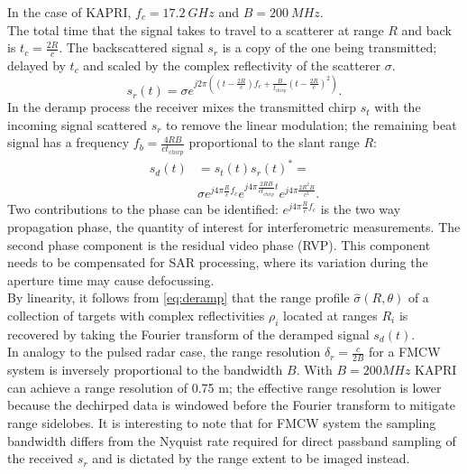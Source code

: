 In the case of KAPRI, $f_c= 17.2~GHz$ and $B=200~MHz$.\\
The total time that the signal takes to travel to a scatterer at range $R$ and back is $t_{c} = \frac{2 R}{c}$. The backscattered signal $s_r$ is a copy of the one being transmitted; delayed by $t_{c}$ and scaled by the complex reflectivity of the scatterer $\sigma$.
\begin{equation}
		s_r\left(t\right) = \sigma e^{j 2 \pi \left( \left(t - \frac{2 R}{c}\right) f_{c} +  \frac{B}{t_{chirp}} \left(t - \frac{2 R}{c}\right)^2 \right)}.
\end{equation}
In the deramp process the receiver mixes the transmitted chirp $s_t$ with the incoming signal scattered $s_r$ to remove the linear modulation; the remaining beat signal has a frequency $f_{b} = \frac{4 R B}{c t_{chirp}}$ proportional to the slant range $R$:
\begin{equation}\label{eq:deramp}
	\begin{aligned}
	s_{d}\left(t\right) &=s_t\left(t\right)s_r\left(t\right)^* =\\ 
	&\sigma e^{j 4 \pi \frac{ R}{c}f_c}  e^{j 4 \pi \frac{2 R B }{c t_{chirp}} t}  e^{j 4 \pi \frac{2 R^2 B}{c^2}}.
	\end{aligned}
\end{equation} 
Two contributions to the phase can be identified: $ e^{j 4 \pi \frac{R}{c}f_c}$ is the two way propagation phase, the quantity of interest for  interferometric measurements. The second phase component is the residual video phase (RVP). This component needs to be compensated for SAR processing, where its variation during the aperture time may cause defocussing.\\
By linearity, it follows from \autoref{eq:deramp} that the range profile $\hat{\sigma}\left(R, \theta\right)$ of a collection of targets with complex reflectivities $\rho_i$ located at ranges $R_{i}$ is recovered by taking the Fourier transform of the deramped signal $s_{d}\left(t\right)$.\\
In analogy to the pulsed radar case, the range resolution $\delta_{r} = \frac{c}{2 B}$ for a FMCW system is inversely proportional to the bandwidth $B$. With $B=200 MHz$ KAPRI can achieve a range resolution of 0.75 m\cite{Strozzi2011}; the effective range resolution is lower because the dechirped data is windowed before the Fourier transform to mitigate range sidelobes. It is interesting to note that for FMCW system the sampling bandwidth differs from the Nyquist rate required for direct passband sampling of the received $s_r$ and is dictated by the range extent to be imaged instead\cite{Meta2006}.\\
